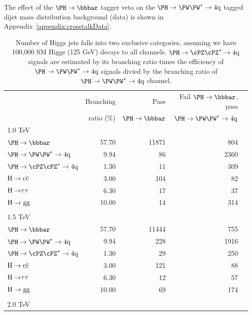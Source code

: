 The effect of the $\Hbb$ tagger veto on the $\Hww$ tagged dijet 
mass distribution
background (data) is shown in Appendix~\ref{appendix:crosstalkData}.


\begin{table}[htbp]
\begin{center}
\caption{Number of Higgs jets falls into two exclusive categories, assuming we have 100,000 SM Higgs (125 GeV) decays to all channels.
$\Hzz$ signals are estimated by its branching ratio times the efficiency of $\Hww$ signals divied by the branching ratio of $\Hww$ channel. }
\begin{tabular}{|l|r|r|r|r|}
\hline
& Branching  & Pass       & Fail $\Hbb$, pass \\
& ratio (\%) & $\Hbb$  &   $\Hww$ \\ 
\hline
1.0 TeV & & & \\
$\Hbb$ & 57.70 & 11871 &  804 \\ %
$\Hww$ & 9.94 & 86 &  2360 \\ %
$\Hzz$ & 1.30 & 11  & 309  \\ %
${\rm H\to c\bar{c}}$ & 3.00 & 104 & 82 \\ %
${\rm H\to} \tau \tau$ & 6.30 & 17 & 37 \\ %
${\rm H\to gg}$ & 10.00 & 14 & 314 \\ 
\hline
\\
1.5 TeV  & & & \\
$\Hbb$ & 57.70 & 11444 &  755 \\ %
$\Hww$ & 9.94 & 228 & 1916 \\ %
$\Hzz$ & 1.30 & 29 & 250 \\ %
${\rm H\to c\bar{c}}$ & 3.00 & 121 & 88 \\ %
${\rm H\to} \tau \tau$ & 6.30 & 12  & 57 \\ %
${\rm H\to gg}$ & 10.00 & 69 & 174 \\ %
\hline
\\
2.0 TeV &  & & \\ %

\end{tabular}
\end{center}
\end{table}
